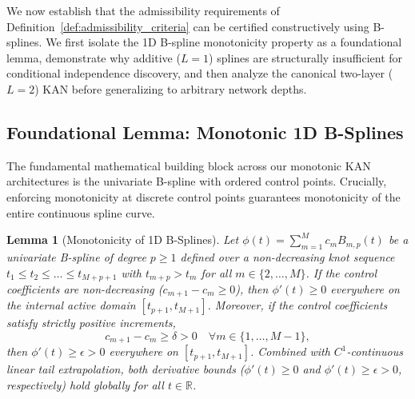 \documentclass[11pt,a4paper]{article}
\theoremstyle{plain}
\newtheorem{lemma}[theorem]{Lemma}
\theoremstyle{definition}
\theoremstyle{remark}
\begin{document}
We now establish that the admissibility requirements of Definition~\ref{def:admissibility_criteria} can be certified constructively using B-splines. We first isolate the 1D B-spline monotonicity property as a foundational lemma, demonstrate why additive ($L=1$) splines are structurally insufficient for conditional independence discovery, and then analyze the canonical two-layer ($L=2$) KAN before generalizing to arbitrary network depths.

\subsection{Foundational Lemma: Monotonic 1D B-Splines}
\label{subsec:bspline_foundation}

The fundamental mathematical building block across our monotonic KAN architectures is the univariate B-spline with ordered control points. Crucially, enforcing monotonicity at discrete control points guarantees monotonicity of the entire continuous spline curve.

\begin{lemma}[Monotonicity of 1D B-Splines]
\label{lem:bspline_mono}
Let $\phi(t) = \sum_{m=1}^M c_m B_{m, p}(t)$ be a univariate B-spline of degree $p \ge 1$ defined over a non-decreasing knot sequence $t_1 \le t_2 \le \dots \le t_{M+p+1}$ with $t_{m+p} > t_m$ for all $m \in \{2, \dots, M\}$. If the control coefficients are non-decreasing ($c_{m+1} - c_m \ge 0$), then $\phi'(t) \ge 0$ everywhere on the internal active domain $[t_{p+1}, t_{M+1}]$. Moreover, if the control coefficients satisfy strictly positive increments,
\begin{equation}
    c_{m+1} - c_m \ge \delta > 0 \quad \forall m \in \{1, \dots, M-1\},
    \label{eq:bspline_diff_condition}
\end{equation}
then $\phi'(t) \ge \epsilon > 0$ everywhere on $[t_{p+1}, t_{M+1}]$. Combined with $C^1$-continuous linear tail extrapolation, both derivative bounds ($\phi'(t) \ge 0$ and $\phi'(t) \ge \epsilon > 0$, respectively) hold globally for all $t \in \mathbb{R}$.
\end{lemma}
\end{document}
